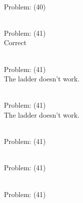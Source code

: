 \documentclass[11pt]{article}
\begin{document}
\begin{minipage}[t]{0.5\textwidth}
  {\centering
  
\\
Problem: (40)\\
  }
\end{minipage}
\begin{minipage}[t]{0.5\textwidth}
  {\centering
  
\\
Problem: (41)\\
Correct\\
  }
\end{minipage}
\begin{minipage}[t]{0.5\textwidth}
  {\centering
  
\\
Problem: (41)\\
The ladder doesn't work.\\
  }
\end{minipage}
\begin{minipage}[t]{0.5\textwidth}
  {\centering
  
\\
Problem: (41)\\
The ladder doesn't work.\\
  }
\end{minipage}
\begin{minipage}[t]{0.5\textwidth}
  {\centering
  
\\
Problem: (41)\\
  }
\end{minipage}
\begin{minipage}[t]{0.5\textwidth}
  {\centering
  
\\
Problem: (41)\\
  }
\end{minipage}
\begin{minipage}[t]{0.5\textwidth}
  {\centering
  
\\
Problem: (41)\\
  }
\end{minipage}
\end{document}
